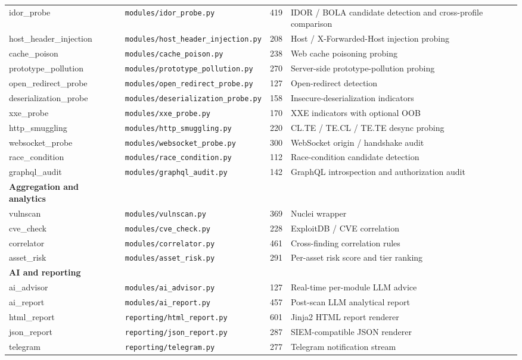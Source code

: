 \begin{longtable}{|l|l|r|p{5.6cm}|}
idor\_probe             & \texttt{modules/idor\_probe.py}            &  419 & IDOR / BOLA candidate detection and cross-profile comparison \\
host\_header\_injection & \texttt{modules/host\_header\_injection.py}&  208 & Host / X-Forwarded-Host injection probing \\
cache\_poison           & \texttt{modules/cache\_poison.py}          &  238 & Web cache poisoning probing \\
prototype\_pollution    & \texttt{modules/prototype\_pollution.py}   &  270 & Server-side prototype-pollution probing \\
open\_redirect\_probe   & \texttt{modules/open\_redirect\_probe.py}  &  127 & Open-redirect detection \\
deserialization\_probe  & \texttt{modules/deserialization\_probe.py} &  158 & Insecure-deserialization indicators \\
xxe\_probe              & \texttt{modules/xxe\_probe.py}             &  170 & XXE indicators with optional OOB \\
http\_smuggling         & \texttt{modules/http\_smuggling.py}        &  220 & CL.TE / TE.CL / TE.TE desync probing \\
websocket\_probe        & \texttt{modules/websocket\_probe.py}       &  300 & WebSocket origin / handshake audit \\
race\_condition         & \texttt{modules/race\_condition.py}        &  112 & Race-condition candidate detection \\
graphql\_audit          & \texttt{modules/graphql\_audit.py}         &  142 & GraphQL introspection and authorization audit \\
\hline
\textbf{Aggregation and analytics} & & & \\
vulnscan                & \texttt{modules/vulnscan.py}               &  369 & Nuclei wrapper \\
cve\_check              & \texttt{modules/cve\_check.py}             &  228 & ExploitDB / CVE correlation \\
correlator              & \texttt{modules/correlator.py}             &  461 & Cross-finding correlation rules \\
asset\_risk             & \texttt{modules/asset\_risk.py}            &  291 & Per-asset risk score and tier ranking \\
\hline
\textbf{AI and reporting} & & & \\
ai\_advisor             & \texttt{modules/ai\_advisor.py}            &  127 & Real-time per-module LLM advice \\
ai\_report              & \texttt{modules/ai\_report.py}             &  457 & Post-scan LLM analytical report \\
html\_report            & \texttt{reporting/html\_report.py}         &  601 & Jinja2 HTML report renderer \\
json\_report            & \texttt{reporting/json\_report.py}         &  287 & SIEM-compatible JSON renderer \\
telegram                & \texttt{reporting/telegram.py}             &  277 & Telegram notification stream \\
\hline
\end{longtable}
